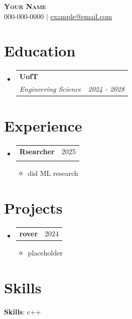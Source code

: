 \documentclass[letterpaper,11pt]{article}
\makeatletter
\newcommand{\resumeItem}[1]{
  \item\small{
    {#1 \vspace{-1pt}}
  }
}
\newcommand{\resumeSubheading}[4]{
  \vspace{-2pt}\item
    \begin{tabular*}{0.97\textwidth}[t]{l@{\extracolsep{\fill}}r}
      \textbf{#1} & #2 \\
      \textit{\small#3} & \textit{\small #4} \\
    \end{tabular*}\vspace{-7pt}
}
\newcommand{\resumeProjectHeading}[2]{
    \item
    \begin{tabular*}{0.97\textwidth}{l@{\extracolsep{\fill}}r}
      \small#1 & #2 \\
    \end{tabular*}\vspace{-7pt}
}
\newcommand{\resumeSubHeadingListStart}{\begin{itemize}[leftmargin=0.15in, label={}]}
\newcommand{\resumeSubHeadingListEnd}{\end{itemize}}
\newcommand{\resumeItemListStart}{\begin{itemize}}
\newcommand{\resumeItemListEnd}{\end{itemize}\vspace{-5pt}}
\makeatother
\begin{document}
\begin{center}
    \textbf{\Huge \scshape Your Name} \\ \vspace{1pt}
    \small 000-000-0000 $|$ \href{mailto:example@email.com}{\underline{example@email.com}}
\end{center}

\section{Education}
  \resumeSubHeadingListStart
    \resumeSubheading
      {UofT}{}
      {Engineering Science }{2024 - 2028}
  \resumeSubHeadingListEnd


\section{Experience}
  \resumeSubHeadingListStart
    \resumeSubheading
      {Rsearcher}{2025}
      {}{}
      \resumeItemListStart
        \resumeItem{did ML research}
      \resumeItemListEnd
  \resumeSubHeadingListEnd


\section{Projects}
    \resumeSubHeadingListStart
    \resumeProjectHeading
      {\textbf{rover}} {2024}
      \resumeItemListStart
        \resumeItem{placeholder}
      \resumeItemListEnd
    \resumeSubHeadingListEnd


\section{Skills}
 \begin{itemize}[leftmargin=0.15in, label={}]
    \small{\item{
     \textbf{Skills}{: c++} \\
    }}
 \end{itemize}

\end{document}
